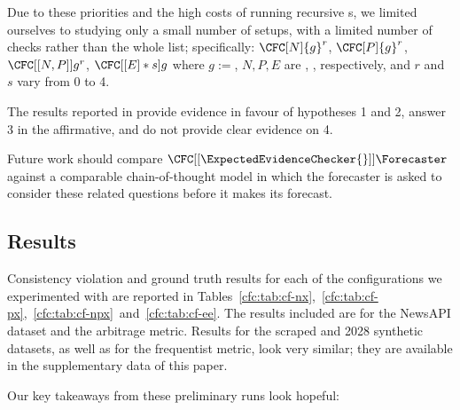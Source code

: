 Due to these priorities and the high costs of running recursive \CFCaster{}s, we limited ourselves to studying only a small number of \CFCaster{} setups, with a limited number of checks rather than the whole list; specifically: $\CFC[N]{g}^r$, $\CFC[P]{g}^r$, $\CFC[[N,P]]{g}^r$, $\CFC[[E]*s]{g}$ where $g:=$\gptfouromini{}, $N,P,E$ are \NegChecker{}, \ParaphraseChecker{}, \ExpectedEvidenceChecker{} respectively, and $r$ and $s$ vary from 0 to 4.

The results reported in  provide evidence in favour of hypotheses 1 and 2, answer 3 in the affirmative, and do not provide clear evidence on 4.

Future work should compare $\CFC[[\ExpectedEvidenceChecker{}]]{\Forecaster}$ against a comparable chain-of-thought model in which the forecaster is asked to consider these related questions before it makes its forecast.

\subsection{Results}
\label{cfc:sec:cf-results}
\label{cfc:app:cf-results}

Consistency violation and ground truth results for each of the \CFCaster{} configurations we experimented with are reported in Tables~\ref{cfc:tab:cf-nx},~\ref{cfc:tab:cf-px},~\ref{cfc:tab:cf-npx}~and~\ref{cfc:tab:cf-ee}. The results included are for the NewsAPI dataset and the arbitrage metric.
Results for the scraped and 2028 synthetic datasets, as well as for the
frequentist metric, look very similar; they are available in the supplementary data of this paper.

Our key takeaways from these preliminary runs look hopeful:


